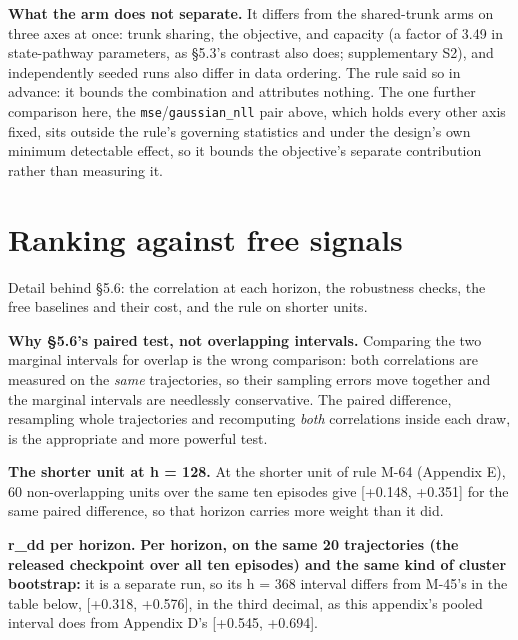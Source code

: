 \documentclass[10pt]{article}
\begin{document}
\textbf{What the arm does not separate.} It differs from the shared-trunk arms on three axes at once: trunk sharing, the objective, and capacity (a factor of 3.49 in state-pathway parameters, as \S{}5.3's contrast also does; supplementary S2), and independently seeded runs also differ in data ordering. The rule said so in advance: it bounds the combination and attributes nothing. The one further comparison here, the \texttt{mse}/\texttt{gaussian\_nll} pair above, which holds every other axis fixed, sits outside the rule's governing statistics and under the design's own minimum detectable effect, so it bounds the objective's separate contribution rather than measuring it.


\section{Ranking against free signals}

Detail behind \S{}5.6: the correlation at each horizon, the robustness checks, the free baselines and their cost, and the rule on shorter units.

\textbf{Why \S{}5.6's paired test, not overlapping intervals.} Comparing the two marginal intervals for overlap is the wrong comparison: both correlations are measured on the \emph{same} trajectories, so their sampling errors move together and the marginal intervals are needlessly conservative. The paired difference, resampling whole trajectories and recomputing \emph{both} correlations inside each draw, is the appropriate and more powerful test.

\textbf{The shorter unit at h = 128.} At the shorter unit of rule M-64 (Appendix E), 60 non-overlapping units over the same ten episodes give [+0.148, +0.351] for the same paired difference, so that horizon carries more weight than it did.

\textbf{r\_dd per horizon.} \textbf{Per horizon, on the same 20 trajectories (the released checkpoint over all ten episodes) and the same kind of cluster bootstrap:} it is a separate run, so its h = 368 interval differs from M-45's in the table below, [+0.318, +0.576], in the third decimal, as this appendix's pooled interval does from Appendix D's [+0.545, +0.694].

\begin{center}\small{}\end{center}
\end{document}
